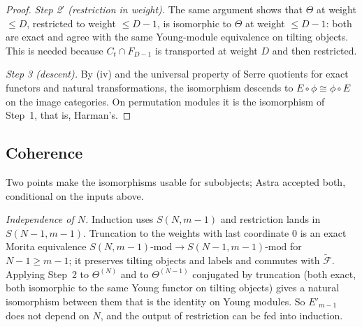 \begin{proof}
\emph{Step 2$'$ (restriction in weight).}  The same argument shows that $\Theta$ at weight
$\le D$, restricted to weight $\le D-1$, is isomorphic to $\Theta$ at weight $\le D-1$: both
are exact and agree with the same Young-module equivalence on tilting objects.  This is needed
because $C_t\cap F_{D-1}$ is transported at weight $D$ and then restricted.

\emph{Step 3 (descent).}  By (iv) and the universal property of Serre quotients for exact
functors and natural transformations, the isomorphism descends to $E\circ\phi\cong\phi\circ E$
on the image categories.  On permutation modules it is the isomorphism of Step~1, that is,
Harman's.
\end{proof}

\subsection{Coherence}\label{app:coherence}

Two points make the isomorphisms usable for subobjects; Astra accepted both, conditional on the
inputs above.

\emph{Independence of $N$.}  Induction uses $S(N,m-1)$ and restriction lands in
$S(N-1,m-1)$.  Truncation to the weights with last coordinate $0$ is an exact Morita
equivalence $S(N,m-1)\text{-mod}\to S(N-1,m-1)\text{-mod}$ for $N-1\ge m-1$; it preserves
tilting objects and labels and commutes with $\tilde{\mathcal F}$.  Applying Step~2 to
$\Theta^{(N)}$ and to $\Theta^{(N-1)}$ conjugated by truncation (both exact, both isomorphic
to the same Young functor on tilting objects) gives a natural isomorphism between them that is
the identity on Young modules.  So $E'_{m-1}$ does not depend on $N$, and the output of
restriction can be fed into induction.

